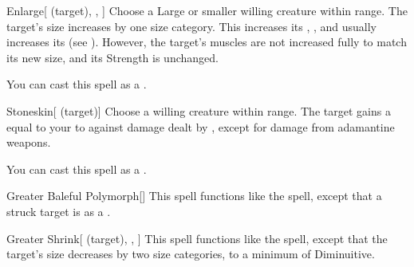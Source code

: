 \lowercase{\hypertarget{spell:Enlarge}{}}\label{spell:Enlarge}
\begin{attuneability}[\nth{3}]{\hypertarget{spell:Enlarge}{Enlarge}}[ (target), , ]
Choose a Large or smaller willing creature within \rngclose range.
The target's size increases by one size category.
This increases its , , and usually increases its  (see ).
However, the target's muscles are not increased fully to match its new size, and its Strength is unchanged.

You can cast this spell as a .
\end{attuneability}
\vspace{0.25em}



\lowercase{\hypertarget{spell:Stoneskin}{}}\label{spell:Stoneskin}
\begin{attuneability}[\nth{3}]{\hypertarget{spell:Stoneskin}{Stoneskin}}[ (target)]
Choose a willing creature within \rngclose range.
The target gains a  equal to your  to  against damage dealt by , except for damage from adamantine weapons.

You can cast this spell as a .
\end{attuneability}
\vspace{0.25em}



\lowercase{\hypertarget{spell:Greater Baleful Polymorph}{}}\label{spell:Greater Baleful Polymorph}
\begin{freeability}[\nth{4}]{\hypertarget{spell:Greater Baleful Polymorph}{Greater Baleful Polymorph}}[]
This spell functions like the  spell, except that a struck target is  as a .
\end{freeability}
\vspace{0.25em}



\lowercase{\hypertarget{spell:Greater Shrink}{}}\label{spell:Greater Shrink}
\begin{attuneability}[\nth{4}]{\hypertarget{spell:Greater Shrink}{Greater Shrink}}[ (target), , ]
This spell functions like the  spell, except that the target's size decreases by two size categories, to a minimum of Diminuitive.
\end{attuneability}
\vspace{0.25em}



